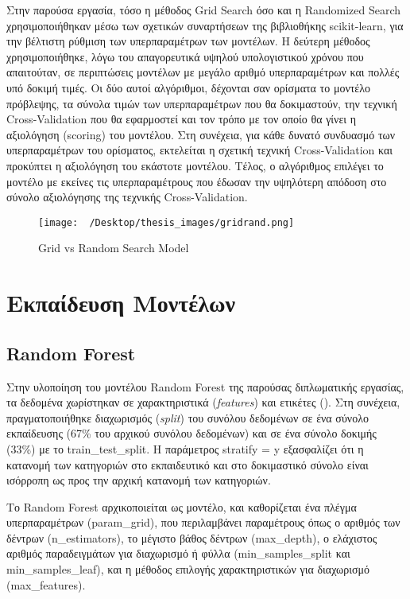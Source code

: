\documentclass[diploma]{softlab-thesis}
\begin{document}
\begin{enumerate}
\begin{enumerate}
Στην παρούσα εργασία, τόσο η μέθοδος Grid Search όσο και η Randomized Search χρησιμοποιήθηκαν μέσω των σχετικών συναρτήσεων της βιβλιοθήκης scikit-learn, για την βέλτιστη ρύθμιση των υπερπαραμέτρων των μοντέλων. Η δεύτερη μέθοδος χρησιμοποιήθηκε, λόγω του απαγορευτικά υψηλού υπολογιστικού χρόνου που απαιτούταν, σε περιπτώσεις μοντέλων με μεγάλο αριθμό υπερπαραμέτρων και πολλές υπό δοκιμή τιμές. Οι δύο αυτοί αλγόριθμοι, δέχονται σαν ορίσματα το μοντέλο πρόβλεψης, τα σύνολα τιμών των υπερπαραμέτρων που θα δοκιμαστούν, την τεχνική Cross-Validation που θα εφαρμοστεί και τον τρόπο με τον οποίο θα γίνει η αξιολόγηση (scoring) του μοντέλου. Στη συνέχεια, για κάθε δυνατό συνδυασμό των υπερπαραμέτρων του ορίσματος, εκτελείται η σχετική τεχνική Cross-Validation και προκύπτει η αξιολόγηση του εκάστοτε μοντέλου. Τέλος, ο αλγόριθμος επιλέγει το μοντέλο με εκείνες τις υπερπαραμέτρους που έδωσαν την υψηλότερη απόδοση στο σύνολο αξιολόγησης της τεχνικής Cross-Validation.

\begin{figure}[H]
    \centering
    \texttt{[image: ~/Desktop/thesis\_images/gridrand.png]} %
    \caption{Grid vs Random Search Model}
    \label{fig:your_image_label}
\end{figure}

\section{Εκπαίδευση Μοντέλων}

\subsection{Random Forest}

Στην υλοποίηση του μοντέλου Random Forest της παρούσας διπλωματικής εργασίας, τα δεδομένα χωρίστηκαν  σε χαρακτηριστικά (\textit{features}) και ετικέτες (). Στη συνέχεια, πραγματοποιήθηκε διαχωρισμός (\textit{split}) του συνόλου δεδομένων σε ένα σύνολο εκπαίδευσης (67\% του αρχικού συνόλου δεδομένων) και σε ένα σύνολο δοκιμής (33\%) με το train\_test\_split. Η παράμετρος stratify = y εξασφαλίζει ότι η κατανομή των κατηγοριών στο εκπαιδευτικό και στο δοκιμαστικό σύνολο είναι ισόρροπη ως προς την αρχική κατανομή των κατηγοριών. 

Το Random Forest αρχικοποιείται ως μοντέλο, και καθορίζεται ένα πλέγμα υπερπαραμέτρων (param\_grid), που περιλαμβάνει παραμέτρους όπως ο αριθμός των δέντρων (n\_estimators), το μέγιστο βάθος δέντρων (max\_depth), ο ελάχιστος αριθμός παραδειγμάτων για διαχωρισμό ή φύλλα (min\_samples\_split και min\_samples\_leaf), και η μέθοδος επιλογής χαρακτηριστικών για διαχωρισμό (max\_features).


\end{enumerate}
\end{enumerate}
\end{document}
